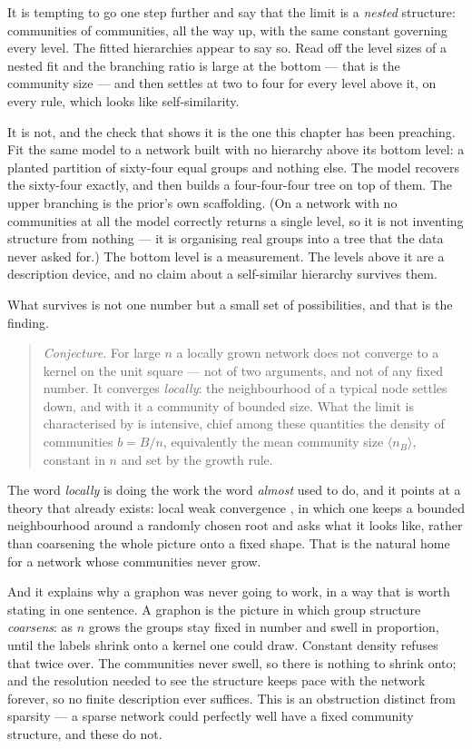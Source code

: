 It is tempting to go one step further and say that the limit is a \emph{nested}
structure: communities of communities, all the way up, with the same constant
governing every level. The fitted hierarchies appear to say so. Read off the level
sizes of a nested fit and the branching ratio is large at the bottom --- that is
the community size --- and then settles at two to four for every level above it,
on every rule, which looks like self-similarity.

It is not, and the check that shows it is the one this chapter has been preaching.
Fit the same model to a network built with no hierarchy above its bottom level: a
planted partition of sixty-four equal groups and nothing else. The model recovers
the sixty-four exactly, and then builds a four-four-four tree on top of them. The
upper branching is the prior's own scaffolding. (On a network with no communities
at all the model correctly returns a single level, so it is not inventing
structure from nothing --- it is organising real groups into a tree that the data
never asked for.) The bottom level is a measurement. The levels above it are a
description device, and no claim about a self-similar hierarchy survives them.

What survives is not one number but a small set of possibilities, and that is the
finding.

\begin{quote}
\emph{Conjecture.} For large $n$ a locally grown network does not converge to a
kernel on the unit square --- not of two arguments, and not of any fixed number.
It converges \emph{locally}: the neighbourhood of a typical node settles down,
and with it a community of bounded size. What the limit is characterised by is
intensive, chief among these quantities the density of communities $b=B/n$,
equivalently the mean community size $\langle n_B\rangle$, constant in $n$ and set
by the growth rule.
\end{quote}

\noindent The word \emph{locally} is doing the work the word \emph{almost} used
to do, and it points at a theory that already exists: local weak convergence
\citep{benjamini2001}, in which one keeps a bounded neighbourhood around a
randomly chosen root and asks what it looks like, rather than coarsening the
whole picture onto a fixed shape.
That is the natural home for a network whose communities never grow.

And it explains why a graphon was never going to work, in a way that is worth
stating in one sentence. A graphon is the picture in which group structure
\emph{coarsens}: as $n$ grows the groups stay fixed in number and swell in
proportion, until the labels shrink onto a kernel one could draw. Constant density
refuses that twice over. The communities never swell, so there is nothing to shrink
onto; and the resolution needed to see the structure keeps pace with the network
forever, so no finite description ever suffices. This is an obstruction distinct
from sparsity --- a sparse network could perfectly well have a fixed community
structure, and these do not.

